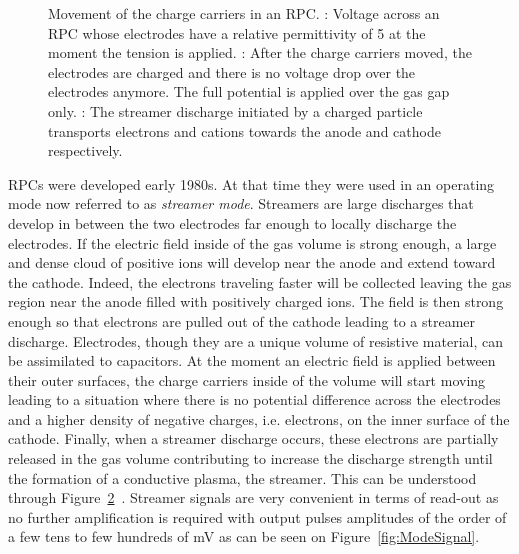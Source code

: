 \begin{figure}
\begin{subfigure}{\linewidth}
			\caption{\label{fig:ElecCharge:C}}
		\end{subfigure}
		\caption{\label{fig:ElecCharge} Movement of the charge carriers in an RPC. : Voltage across an RPC whose electrodes have a relative permittivity of 5 at the moment the tension is applied. : After the charge carriers moved, the electrodes are charged and there is no voltage drop over the electrodes anymore. The full potential is applied over the gas gap only. : The streamer discharge initiated by a charged particle transports electrons and cations towards the anode and cathode respectively.}
	\end{figure}
	
	RPCs were developed early 1980s. At that time they were used in an operating mode now referred to as \textit{streamer mode}. Streamers are large discharges that develop in between the two electrodes far enough to locally discharge the electrodes. If the electric field inside of the gas volume is strong enough, a large and dense cloud of positive ions will develop near the anode and extend toward the cathode. Indeed, the electrons traveling faster will be collected leaving the gas region near the anode filled with positively charged ions. The field is then strong enough so that electrons are pulled out of the cathode leading to a streamer discharge. Electrodes, though they are a unique volume of resistive material, can be assimilated to capacitors. At the moment an electric field is applied between their outer surfaces, the charge carriers inside of the volume will start moving leading to a situation where there is no potential difference across the electrodes and a higher density of negative charges, i.e. electrons, on the inner surface of the cathode. Finally, when a streamer discharge occurs, these electrons are partially released in the gas volume contributing to increase the discharge strength until the formation of a conductive plasma, the streamer. This can be understood through Figure~\ref{fig:ElecCharge}~\cite{CROTTY93}. Streamer signals are very convenient in terms of read-out as no further amplification is required with output pulses amplitudes of the order of a few tens to few hundreds of \si{mV} as can be seen on Figure~\ref{fig:ModeSignal}.
	

